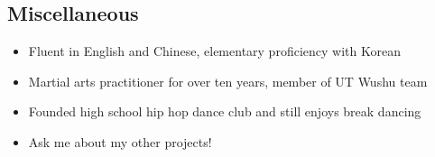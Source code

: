 \documentclass[line,margin]{res}
\begin{document}
\begin{resume}
\vspace{-8pt}
\section{Miscellaneous} 
\vspace{22pt}
    \begin{itemize} \itemsep -2pt %
    \item Fluent in English and Chinese, elementary proficiency with Korean
    \item Martial arts practitioner for over ten years, member of UT Wushu team
    \item Founded high school hip hop dance club and still enjoys break dancing
    \item Ask me about my other projects!
    \end{itemize}

\end{resume} 
\end{document}

